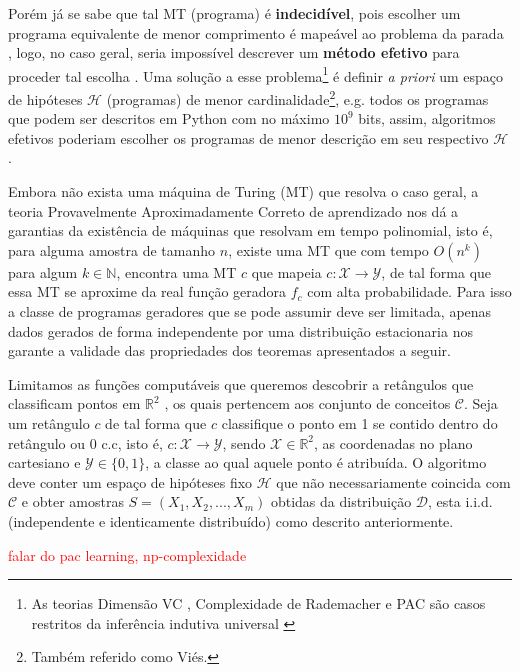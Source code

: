 Porém já se sabe que tal MT (programa) é \textbf{indecidível}, pois escolher um
programa equivalente de menor comprimento é mapeável ao problema da parada
\cite{sipser2012introduction,solomonoff1978complexity}, logo, no caso geral,
seria impossível descrever um \textbf{método efetivo} para proceder tal escolha
\cite{hutter2004universal}. Uma solução a esse problema\footnote{As teorias
Dimensão VC \cite{vapnik2013nature}, Complexidade de Rademacher
\cite{bartlett2002rademacher} e PAC \cite{valiant1984theory} são casos
restritos da inferência indutiva universal
\cite{li1992inductive,blumer1989learnability}} é definir \textit{a priori} um
espaço de hipóteses $\mathcal{H}$ (programas) de menor
cardinalidade\footnote{Também referido como Viés.}, e.g. todos os programas que
podem ser descritos em Python com no máximo $10^9$ bits, assim, algoritmos
efetivos poderiam escolher os programas de menor descrição em seu respectivo
$\mathcal{H}$ \cite{rathmanner2011philosophical}.

Embora não exista uma máquina de Turing (MT) que resolva o caso geral, a teoria
Provavelmente Aproximadamente Correto de aprendizado nos dá a garantias da
existência de máquinas que resolvam em tempo polinomial, isto é, para alguma
amostra de tamanho $n$, existe uma MT que com tempo $O(n^k)$ para algum $k \in
\mathbb{N}$, encontra uma MT $c$ que mapeia
$c:\mathcal{X}\rightarrow\mathcal{Y}$, de tal forma que essa MT se aproxime da
real função geradora $f_c$ com alta probabilidade. Para isso a classe de
programas geradores que se pode assumir deve ser limitada, apenas dados gerados
de forma independente por uma distribuição estacionaria nos garante a validade
das propriedades dos teoremas apresentados a seguir.

Limitamos as funções computáveis que queremos descobrir a retângulos que
classificam pontos em $\mathbb{R}^2$ , os quais pertencem aos conjunto de
conceitos $\mathcal{C}$. Seja um retângulo $c$ de tal forma que $c$ classifique
o ponto em 1 se contido dentro do retângulo ou 0 c.c, isto é,
$c:\mathcal{X}\rightarrow\mathcal{Y}$, sendo $\mathcal{X} \in \mathbb{R}^2$, as
coordenadas no plano cartesiano e $\mathcal{Y} \in \{0,1\}$, a classe ao qual
aquele ponto é atribuída. O algoritmo deve conter um espaço de hipóteses fixo
$\mathcal{H}$ que não necessariamente coincida com $\mathcal{C}$ e obter
amostras $S=(X_1,X_2,...,X_m)$ obtidas da distribuição $\mathcal{D}$, esta
i.i.d. (independente e identicamente distribuído) como descrito anteriormente.

\textcolor{red}{falar do pac learning, np-complexidade}

